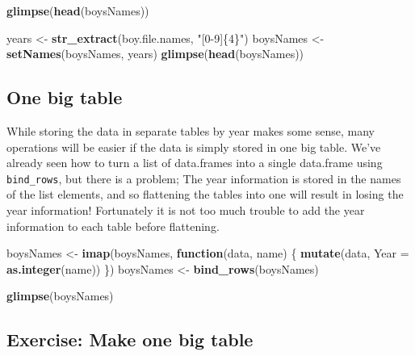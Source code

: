 \documentclass[]{book}
\newenvironment{Shaded}{\begin{snugshade}}{\end{snugshade}}
\newcommand{\KeywordTok}[1]{\textcolor[rgb]{0.13,0.29,0.53}{\textbf{#1}}}
\newcommand{\DataTypeTok}[1]{\textcolor[rgb]{0.13,0.29,0.53}{#1}}
\newcommand{\StringTok}[1]{\textcolor[rgb]{0.31,0.60,0.02}{#1}}
\newcommand{\ControlFlowTok}[1]{\textcolor[rgb]{0.13,0.29,0.53}{\textbf{#1}}}
\newcommand{\NormalTok}[1]{#1}
\begin{document}
\begin{Shaded}
\begin{Highlighting}[]
\KeywordTok{glimpse}\NormalTok{(}\KeywordTok{head}\NormalTok{(boysNames))}
\end{Highlighting}
\end{Shaded}

\begin{Shaded}
\begin{Highlighting}[]
\NormalTok{years <-}\StringTok{ }\KeywordTok{str_extract}\NormalTok{(boy.file.names, }\StringTok{"[0-9]\{4\}"}\NormalTok{)}
\NormalTok{boysNames <-}\StringTok{ }\KeywordTok{setNames}\NormalTok{(boysNames, years)}
\KeywordTok{glimpse}\NormalTok{(}\KeywordTok{head}\NormalTok{(boysNames))}
\end{Highlighting}
\end{Shaded}

\subsection{One big table}\label{one-big-table}

While storing the data in separate tables by year makes some sense, many
operations will be easier if the data is simply stored in one big table.
We've already seen how to turn a list of data.frames into a single
data.frame using \texttt{bind\_rows}, but there is a problem; The year
information is stored in the names of the list elements, and so
flattening the tables into one will result in losing the year
information! Fortunately it is not too much trouble to add the year
information to each table before flattening.

\begin{Shaded}
\begin{Highlighting}[]
\NormalTok{boysNames <-}\StringTok{ }\KeywordTok{imap}\NormalTok{(boysNames,}
                  \ControlFlowTok{function}\NormalTok{(data, name) \{}
                      \KeywordTok{mutate}\NormalTok{(data, }\DataTypeTok{Year =} \KeywordTok{as.integer}\NormalTok{(name))}
\NormalTok{                      \})}
\NormalTok{boysNames <-}\StringTok{ }\KeywordTok{bind_rows}\NormalTok{(boysNames)}

\KeywordTok{glimpse}\NormalTok{(boysNames)}
\end{Highlighting}
\end{Shaded}

\subsection{Exercise: Make one big
table}\label{exercise-make-one-big-table}
\end{document}

